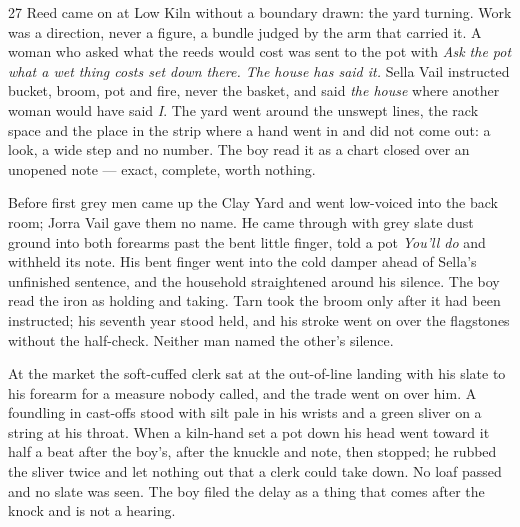 
\scenebreak


\scenebreak


\scenebreak

\CRtailpiece
\begin{CRchronicle}{27}
Reed came on at Low Kiln without a boundary drawn: the yard turning. Work was a direction, never a figure, a bundle judged by the arm that carried it. A woman who asked what the reeds would cost was sent to the pot with \emph{Ask the pot what a wet thing costs set down there. The house has said it.} Sella Vail instructed bucket, broom, pot and fire, never the basket, and said \emph{the house} where another woman would have said \emph{I}. The yard went around the unswept lines, the rack space and the place in the strip where a hand went in and did not come out: a look, a wide step and no number. The boy read it as a chart closed over an unopened note --- exact, complete, worth nothing.

Before first grey men came up the Clay Yard and went low-voiced into the back room; Jorra Vail gave them no name. He came through with grey slate dust ground into both forearms past the bent little finger, told a pot \emph{You’ll do} and withheld its note. His bent finger went into the cold damper ahead of Sella’s unfinished sentence, and the household straightened around his silence. The boy read the iron as holding and taking. Tarn took the broom only after it had been instructed; his seventh year stood held, and his stroke went on over the flagstones without the half-check. Neither man named the other’s silence.

At the market the soft-cuffed clerk sat at the out-of-line landing with his slate to his forearm for a measure nobody called, and the trade went on over him. A foundling in cast-offs stood with silt pale in his wrists and a green sliver on a string at his throat. When a kiln-hand set a pot down his head went toward it half a beat after the boy’s, after the knuckle and note, then stopped; he rubbed the sliver twice and let nothing out that a clerk could take down. No loaf passed and no slate was seen. The boy filed the delay as a thing that comes after the knock and is not a hearing.


\end{CRchronicle}
